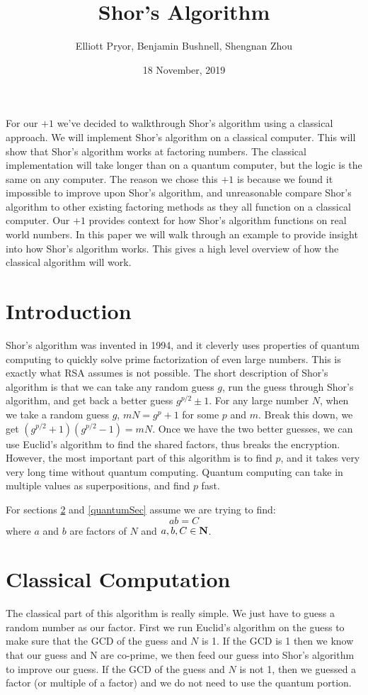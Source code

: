 \documentclass[a4paper]{article}
\title{Shor's Algorithm}
\author{Elliott Pryor, Benjamin Bushnell, Shengnan Zhou}
\date{18 November, 2019}
\begin{document}
\maketitle %

For our $+1$ we've decided to walkthrough Shor's algorithm using a classical approach. We will implement Shor's algorithm on a classical computer. This will show that Shor's algorithm works at factoring numbers. The classical implementation will take longer than on a quantum computer, but the logic is the same on any computer. The reason we chose this $+1$ is because we found it impossible to improve upon Shor's algorithm, and unreasonable compare Shor's algorithm to other existing factoring methods as they all function on a classical computer. Our $+1$ provides context for how Shor's algorithm functions on real world numbers.
In this paper we will walk through an example to provide insight into how Shor's algorithm works. This gives a high level overview of how the classical algorithm will work.

\section{Introduction}
Shor's algorithm was invented in 1994, and it cleverly uses properties of quantum computing to quickly solve prime factorization of even large numbers. This is exactly what RSA assumes is not possible. The short description of Shor's algorithm is that we can take any random guess $g$, run the guess through Shor's algorithm, and get back a better guess $g^{p/2} \pm 1$. For any large number $N$, when we take a random guess $g$, $mN = g^p +1$ for some $p$ and $m$. Break this down, we get $(g^{p/2}+1)(g^{p/2}-1) = mN$. Once we have the two better guesses, we can use Euclid's algorithm to find the shared factors, thus breaks the encryption. However, the most important part of this algorithm is to find $p$, and it takes very very long time without quantum computing. Quantum computing can take in multiple values as superpositions, and find $p$ fast.

For sections \ref{classicalSec} and \ref{quantumSec} assume we are trying to find: 
$$ab = C$$
where $a$ and $b$ are factors of $N$ and $a,b,C \in \mathbf{N}$.

\section{Classical Computation}
\label{classicalSec}
The classical part of this algorithm is really simple. We just have to guess a random number as our factor. First we run Euclid's algorithm on the guess to make sure that the GCD of the guess and $N$ is 1. If the GCD is 1 then we know that our guess and N are co-prime, we then feed our guess into Shor's algorithm to improve our guess. If the GCD of the guess and $N$ is not 1, then we guessed a factor (or multiple of a factor) and we do not need to use the quantum portion.
\end{document}
